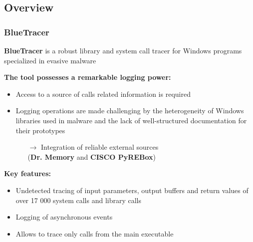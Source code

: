 \documentclass[compress]{beamer}
\begin{document}
\subsection{Overview}
\begin{frame}
    \frametitle{BlueTracer}

\medskip

\begin{beamerboxesrounded}[shadow=true]{}
\textbf{BlueTracer} is a robust library and system call tracer for Windows programs specialized in evasive malware
\end{beamerboxesrounded}

\medskip

\textcolor{sapienza}{\textbf{The tool possesses a remarkable logging power:}}
\begin{itemize}
\item Access to a source of calls related information is required
\item Logging operations are made challenging by the heterogeneity of Windows libraries used in malware and the lack of well-structured documentation for their prototypes
\begin{itemize}
\item[$\rightarrow$] Integration of reliable external sources \\ (\textbf{Dr. Memory}
and \textbf{CISCO PyREBox})
\end{itemize} 
\end{itemize}

\textcolor{sapienza}{\textbf{Key features:}}
\begin{itemize}
\item Undetected tracing of input parameters, output buffers and return values of over 17 000 system calls and library calls
\item Logging of asynchronous events
\item Allows to trace only calls from the main executable
\end{itemize}    

\end{frame}
\end{document}

